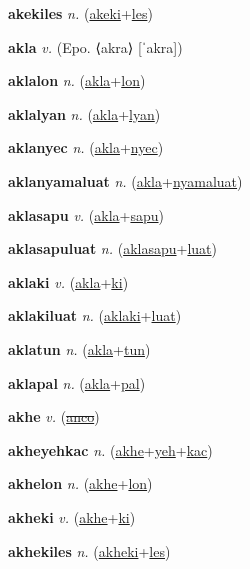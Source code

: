 \textbf{\hypertarget{akekiles}{akekiles}} \textit{n.} (\hyperlink{akeki}{akeki}+\allowbreak \hyperlink{les}{les})


\textbf{\hypertarget{akla}{akla}} \textit{v.} (Epo. ⟨akra⟩ [ˈakra])


\textbf{\hypertarget{aklalon}{aklalon}} \textit{n.} (\hyperlink{akla}{akla}+\allowbreak \hyperlink{lon}{lon})


\textbf{\hypertarget{aklalyan}{aklalyan}} \textit{n.} (\hyperlink{akla}{akla}+\allowbreak \hyperlink{lyan}{lyan})


\textbf{\hypertarget{aklanyec}{aklanyec}} \textit{n.} (\hyperlink{akla}{akla}+\allowbreak \hyperlink{nyec}{nyec})


\textbf{\hypertarget{aklanyamaluat}{aklanyamaluat}} \textit{n.} (\hyperlink{akla}{akla}+\allowbreak \hyperlink{nyamaluat}{nyamaluat})


\textbf{\hypertarget{aklasapu}{aklasapu}} \textit{v.} (\hyperlink{akla}{akla}+\allowbreak \hyperlink{sapu}{sapu})


\textbf{\hypertarget{aklasapuluat}{aklasapuluat}} \textit{n.} (\hyperlink{aklasapu}{aklasapu}+\allowbreak \hyperlink{luat}{luat})


\textbf{\hypertarget{aklaki}{aklaki}} \textit{v.} (\hyperlink{akla}{akla}+\allowbreak \hyperlink{ki}{ki})


\textbf{\hypertarget{aklakiluat}{aklakiluat}} \textit{n.} (\hyperlink{aklaki}{aklaki}+\allowbreak \hyperlink{luat}{luat})


\textbf{\hypertarget{aklatun}{aklatun}} \textit{n.} (\hyperlink{akla}{akla}+\allowbreak \hyperlink{tun}{tun})


\textbf{\hypertarget{aklapal}{aklapal}} \textit{n.} (\hyperlink{akla}{akla}+\allowbreak \hyperlink{pal}{pal})


\textbf{\hypertarget{akhe}{akhe}} \textit{v.} (\hyperlink{anco}{\sout{anco}})


\textbf{\hypertarget{akheyehkac}{akheyehkac}} \textit{n.} (\hyperlink{akhe}{akhe}+\allowbreak \hyperlink{yeh}{yeh}+\allowbreak \hyperlink{kac}{kac})


\textbf{\hypertarget{akhelon}{akhelon}} \textit{n.} (\hyperlink{akhe}{akhe}+\allowbreak \hyperlink{lon}{lon})


\textbf{\hypertarget{akheki}{akheki}} \textit{v.} (\hyperlink{akhe}{akhe}+\allowbreak \hyperlink{ki}{ki})


\textbf{\hypertarget{akhekiles}{akhekiles}} \textit{n.} (\hyperlink{akheki}{akheki}+\allowbreak \hyperlink{les}{les})


